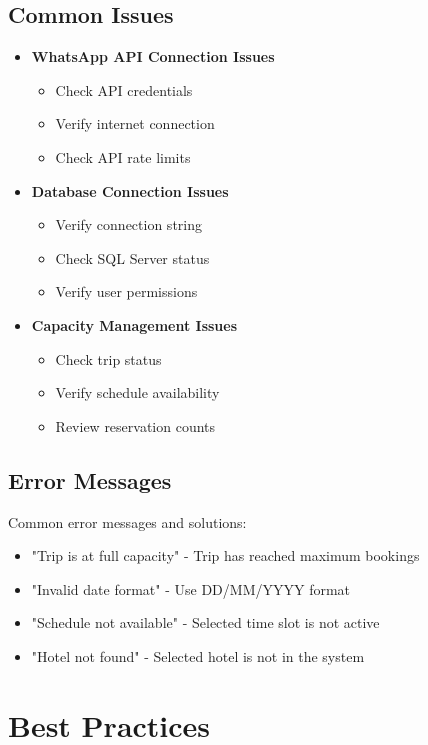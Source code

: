 \subsection{Common Issues}
\begin{itemize}
    \item \textbf{WhatsApp API Connection Issues}
        \begin{itemize}
            \item Check API credentials
            \item Verify internet connection
            \item Check API rate limits
        \end{itemize}
    \item \textbf{Database Connection Issues}
        \begin{itemize}
            \item Verify connection string
            \item Check SQL Server status
            \item Verify user permissions
        \end{itemize}
    \item \textbf{Capacity Management Issues}
        \begin{itemize}
            \item Check trip status
            \item Verify schedule availability
            \item Review reservation counts
        \end{itemize}
\end{itemize}

\subsection{Error Messages}
Common error messages and solutions:
\begin{itemize}
    \item "Trip is at full capacity" - Trip has reached maximum bookings
    \item "Invalid date format" - Use DD/MM/YYYY format
    \item "Schedule not available" - Selected time slot is not active
    \item "Hotel not found" - Selected hotel is not in the system
\end{itemize}

\section{Best Practices}

